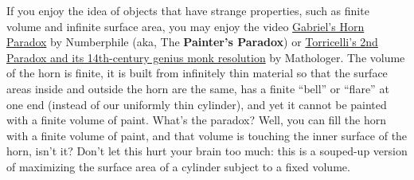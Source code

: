 If you enjoy the idea of objects that have strange properties, such as finite volume and infinite surface area, you may enjoy the video \href{https://www.youtube.com/watch?v=yZOi9HH5ueU}{Gabriel's Horn Paradox} by Numberphile (aka, The  \textbf{Painter's Paradox}) or \href{https://youtu.be/p-LbzWmm2zk}{Torricelli's 2nd Paradox and its 14th-century genius monk resolution} by Mathologer. The volume of the horn is finite, it is built from infinitely thin material so that the surface areas inside and outside the horn are the same, has a finite ``bell'' or ``flare'' at one end (instead of our uniformly thin cylinder), and yet it cannot be painted with a finite volume of paint. What's the paradox? Well, you can fill the horn with a finite volume of paint, and that volume is touching the inner surface of the horn, isn't it? Don't let this hurt your brain too much: this is a souped-up version of maximizing the surface area of a cylinder subject to a fixed volume. 




